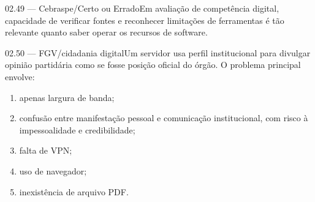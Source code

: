 \begin{questao}{ 02.49 — Cebraspe/Certo ou Errado}Em avaliação de competência digital, capacidade de verificar fontes e reconhecer limitações de ferramentas é tão relevante quanto saber operar os recursos de software.\end{questao}
\begin{questao}{ 02.50 — FGV/cidadania digital}Um servidor usa perfil institucional para divulgar opinião partidária como se fosse posição oficial do órgão. O problema principal envolve:\begin{enumerate}[label=\Alph*)]\item apenas largura de banda;\item confusão entre manifestação pessoal e comunicação institucional, com risco à impessoalidade e credibilidade;\item falta de VPN;\item uso de navegador;\item inexistência de arquivo PDF.\end{enumerate}\end{questao}
